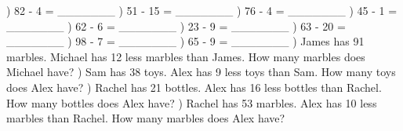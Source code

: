 \documentclass{article}%
\begin{document}
\newline%
) 82 {-} 4 = \_\_\_\_\_\_\_%
\newline%
\newline%
) 51 {-} 15 = \_\_\_\_\_\_\_%
\newline%
\newline%
) 76 {-} 4 = \_\_\_\_\_\_\_%
\newline%
\newline%
) 45 {-} 1 = \_\_\_\_\_\_\_%
\newline%
\newline%
) 62 {-} 6 = \_\_\_\_\_\_\_%
\newline%
\newline%
) 23 {-} 9 = \_\_\_\_\_\_\_%
\newline%
\newline%
) 63 {-} 20 = \_\_\_\_\_\_\_%
\newline%
\newline%
) 98 {-} 7 = \_\_\_\_\_\_\_%
\newline%
\newline%
) 65 {-} 9 = \_\_\_\_\_\_\_%
\newline%
\newline%
) James has 91 marbles. Michael has 12 less marbles than James. How many marbles does Michael have?%
\newline%
\newline%
) Sam has 38 toys. Alex has 9 less toys than Sam. How many toys does Alex have?%
\newline%
\newline%
) Rachel has 21 bottles. Alex has 16 less bottles than Rachel. How many bottles does Alex have?%
\newline%
\newline%
) Rachel has 53 marbles. Alex has 10 less marbles than Rachel. How many marbles does Alex have?%
\newline%
\end{document}
